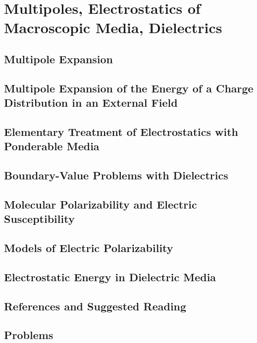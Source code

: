 \setcounter{chapter}{0}
\renewcommand{\thechapter}{4}
\chapter{Multipoles, Electrostatics of Macroscopic Media, Dielectrics}
\setcounter{equation}{0}	        %

\section{Multipole Expansion}

\section{Multipole Expansion of the Energy of a Charge Distribution in an External Field}

\section{Elementary Treatment of Electrostatics with Ponderable Media}

\section{Boundary-Value Problems with Dielectrics}

\section{Molecular Polarizability and Electric Susceptibility}

\section{Models of Electric Polarizability}

\section{Electrostatic Energy in Dielectric Media}



\section*{References and Suggested Reading}


\section*{Problems}

